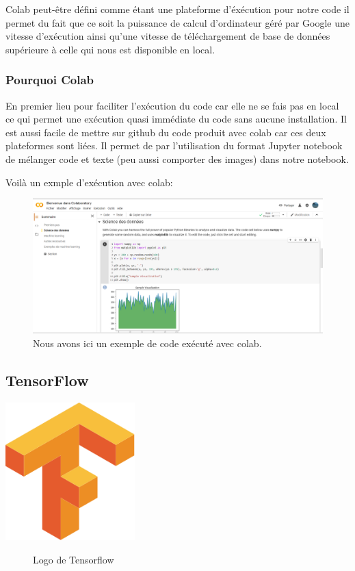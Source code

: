 Colab peut-être défini comme étant une plateforme d'éxécution pour notre code
il permet du fait que ce soit la puissance de calcul d'ordinateur géré par Google une vitesse d'exécution ainsi qu'une vitesse de téléchargement de base de données supérieure à celle qui nous est disponible en local.

\hypertarget{Pourquoi-Colab}{%
\subsubsection{Pourquoi Colab}
\label{Pourquoi-Colab}}
En premier lieu pour faciliter l'exécution du code car elle ne se fais pas en local ce qui permet une exécution quasi immédiate du code sans aucune installation. Il est aussi facile de mettre sur github du code produit avec colab car ces deux plateformes sont liées. Il permet de par l'utilisation du format Jupyter notebook de mélanger code et texte (peu aussi comporter des images) dans notre notebook.

Voilà un exmple d'exécution avec colab:

\begin{figure}[h]
\begin{center}
\includegraphics[width=15cm]{./images/Cap_colab.PNG}
\caption{Nous avons ici un exemple de code exécuté avec colab.}
\end{center}
\end{figure}

\hypertarget{Tensorflow}{%
\subsection{TensorFlow}%
\label{Tensorflow}}


\begin{center}
\label{fig:Tensorflow_logo}
\centering
\includegraphics[width=5cm]{./images/Tensorflow_logo.png}
\begin{figure}[h!]
\caption{Logo de Tensorflow}
\end{figure}
\end{center}


